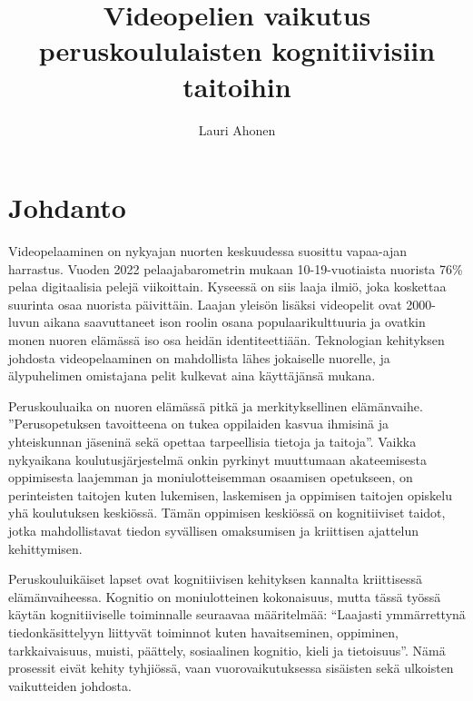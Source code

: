 \documentclass[utf8,bachelor]{gradu3}
\begin{document}
\title{Videopelien vaikutus peruskoululaisten kognitiivisiin taitoihin}
\author{Lauri Ahonen}

\subject{Kandidaatintutkielman}

\maketitle

\mainmatter

\chapter{Johdanto}
Videopelaaminen on nykyajan nuorten keskuudessa suosittu vapaa-ajan harrastus. Vuoden 2022 pelaajabarometrin mukaan 10-19-vuotiaista nuorista 76\% pelaa digitaalisia pelejä viikoittain. \parencite{kinnunen2022pelaajabarometri} Kyseessä on siis laaja ilmiö, joka koskettaa suurinta osaa nuorista päivittäin. Laajan yleisön lisäksi videopelit ovat 2000-luvun aikana saavuttaneet ison roolin osana populaarikulttuuria ja ovatkin monen nuoren elämässä iso osa heidän identiteettiään. Teknologian kehityksen johdosta videopelaaminen on mahdollista lähes jokaiselle nuorelle, ja älypuhelimen omistajana pelit kulkevat aina käyttäjänsä mukana.  

Peruskouluaika on nuoren elämässä pitkä ja merkityksellinen elämänvaihe. ''Perusopetuksen tavoitteena on tukea oppilaiden kasvua ihmisinä ja yhteiskunnan jäseninä sekä opettaa tarpeellisia tietoja ja taitoja''.\parencite{OPH2025} Vaikka nykyaikana koulutusjärjestelmä onkin pyrkinyt muuttumaan akateemisesta oppimisesta laajemman ja moniulotteisemman osaamisen opetukseen, on perinteisten taitojen kuten lukemisen, laskemisen ja oppimisen taitojen opiskelu yhä koulutuksen keskiössä. Tämän oppimisen keskiössä on kognitiiviset taidot, jotka mahdollistavat tiedon syvällisen omaksumisen ja kriittisen ajattelun kehittymisen. 

Peruskouluikäiset lapset ovat kognitiivisen kehityksen kannalta kriittisessä elämänvaiheessa. Kognitio on moniulotteinen kokonaisuus, mutta tässä työssä käytän kognitiiviselle toiminnalle seuraavaa määritelmää: “Laajasti ymmärrettynä tiedonkäsittelyyn liittyvät toiminnot kuten havaitseminen, oppiminen, tarkkaivaisuus, muisti, päättely, sosiaalinen kognitio, kieli ja tietoisuus”. \parencite{hamalainen2006mieli} Nämä prosessit eivät kehity tyhjiössä, vaan vuorovaikutuksessa sisäisten sekä ulkoisten vaikutteiden johdosta. 
\end{document}
